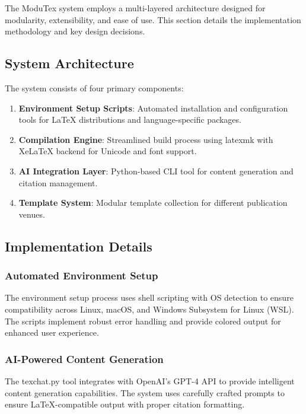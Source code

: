 The ModuTex system employs a multi-layered architecture designed for modularity, extensibility, and ease of use. This section details the implementation methodology and key design decisions.

\subsection{System Architecture}

The system consists of four primary components:

\begin{enumerate}
    \item \textbf{Environment Setup Scripts}: Automated installation and configuration tools for LaTeX distributions and language-specific packages.
    \item \textbf{Compilation Engine}: Streamlined build process using latexmk with XeLaTeX backend for Unicode and font support.
    \item \textbf{AI Integration Layer}: Python-based CLI tool for content generation and citation management.
    \item \textbf{Template System}: Modular template collection for different publication venues.
\end{enumerate}

\subsection{Implementation Details}

\subsubsection{Automated Environment Setup}

The environment setup process uses shell scripting with OS detection to ensure compatibility across Linux, macOS, and Windows Subsystem for Linux (WSL). The scripts implement robust error handling and provide colored output for enhanced user experience.

\subsubsection{AI-Powered Content Generation}

The texchat.py tool integrates with OpenAI's GPT-4 API to provide intelligent content generation capabilities. The system uses carefully crafted prompts to ensure LaTeX-compatible output with proper citation formatting.


